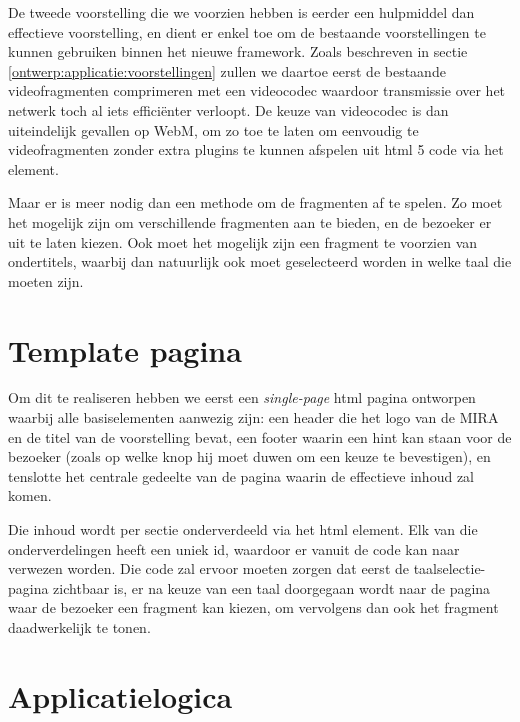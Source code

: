 De tweede voorstelling die we voorzien hebben is eerder een hulpmiddel dan effectieve voorstelling, en dient er enkel toe om de bestaande voorstellingen te kunnen gebruiken binnen het nieuwe framework. Zoals beschreven in sectie \ref{ontwerp:applicatie:voorstellingen} zullen we daartoe eerst de bestaande videofragmenten comprimeren met een videocodec waardoor transmissie over het netwerk toch al iets efficiënter verloopt. De keuze van videocodec is dan uiteindelijk gevallen op WebM, om zo toe te laten om eenvoudig te videofragmenten zonder extra plugins te kunnen afspelen uit \ac{html} 5 code via het  element.

Maar er is meer nodig dan een methode om de fragmenten af te spelen. Zo moet het mogelijk zijn om verschillende fragmenten aan te bieden, en de bezoeker er uit te laten kiezen. Ook moet het mogelijk zijn een fragment te voorzien van ondertitels, waarbij dan natuurlijk ook moet geselecteerd worden in welke taal die moeten zijn.

\section{Template pagina}
\label{voorstellingen:metavoorstelling:template}

Om dit te realiseren hebben we eerst een \emph{single-page} \ac{html} pagina ontworpen waarbij alle basiselementen aanwezig zijn: een header die het logo van de MIRA en de titel van de voorstelling bevat, een footer waarin een hint kan staan voor de bezoeker (zoals op welke knop hij moet duwen om een keuze te bevestigen), en tenslotte het centrale gedeelte van de pagina waarin de effectieve inhoud zal komen.

Die inhoud wordt per sectie onderverdeeld via het \ac{html}  element. Elk van die onderverdelingen heeft een uniek id, waardoor er vanuit de code kan naar verwezen worden. Die code zal ervoor moeten zorgen dat eerst de taalselectie-pagina zichtbaar is, er na keuze van een taal doorgegaan wordt naar de pagina waar de bezoeker een fragment kan kiezen, om vervolgens dan ook het fragment daadwerkelijk te tonen.

\section{Applicatielogica}
\label{voorstellingen:metavoorstelling:logica}

